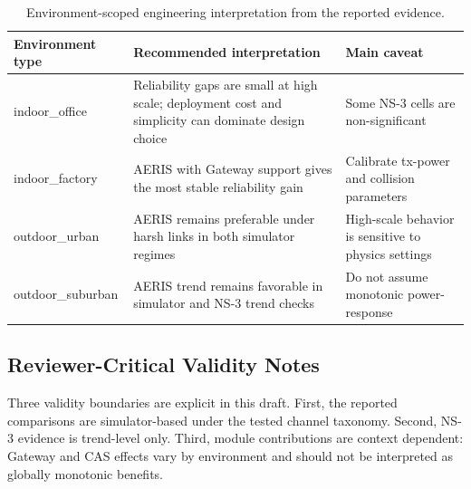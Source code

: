 ﻿\documentclass[sensors,article,submit,moreauthors,pdftex]{Definitions/mdpi}
\begin{document}
\begin{table}[H]
\caption{Environment-scoped engineering interpretation from the reported evidence.}
\label{tab:deployment_summary}
\centering
\small
\begin{tabular}{>{\raggedright\arraybackslash}p{} >{\raggedright\arraybackslash}p{} >{\raggedright\arraybackslash}p{}}
\toprule
Environment type & Recommended interpretation & Main caveat \\
\midrule
indoor\_office & Reliability gaps are small at high scale; deployment cost and simplicity can dominate design choice & Some NS-3 cells are non-significant \\
indoor\_factory & AERIS with Gateway support gives the most stable reliability gain & Calibrate tx-power and collision parameters \\
outdoor\_urban & AERIS remains preferable under harsh links in both simulator regimes & High-scale behavior is sensitive to physics settings \\
outdoor\_suburban & AERIS trend remains favorable in simulator and NS-3 trend checks & Do not assume monotonic power-response \\
\bottomrule
\end{tabular}
\normalsize
\end{table}

\subsection*{Reviewer-Critical Validity Notes}
Three validity boundaries are explicit in this draft. First, the reported comparisons are simulator-based under the tested channel taxonomy. Second, NS-3 evidence is trend-level only. Third, module contributions are context dependent: Gateway and CAS effects vary by environment and should not be interpreted as globally monotonic benefits.
\end{document}

